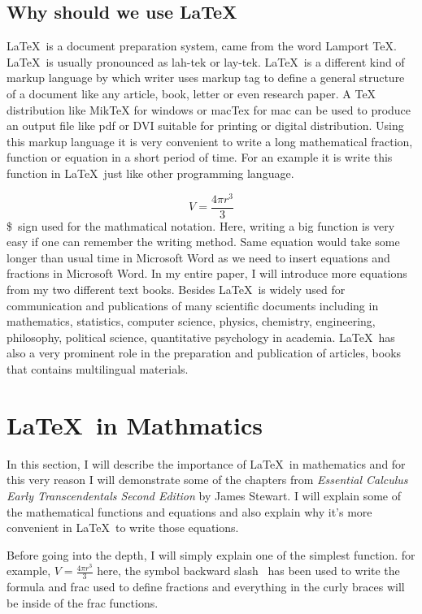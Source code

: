 \documentclass[12pt, a4paper]{article}
\begin{document}
	\subsection*{Why should we use \LaTeX\  }
	

	 \LaTeX\ is a document preparation system, came from the word Lamport TeX. \LaTeX\ is usually pronounced as lah-tek or lay-tek. \LaTeX\ is a different kind of markup language by which writer uses markup tag to define a general structure of a document like any article, book, letter or even research paper. A TeX distribution like MikTeX for windows or macTex for mac can be used to produce an output file like pdf or DVI suitable for printing or digital distribution. Using this markup language it is very convenient to write a long mathematical fraction, function or equation in a short period of time.  For an example it is write this function in \LaTeX\  just like other programming language. 
	
	$$  V = \frac{4 \pi r^3}{3}  $$
	\noindent
\$\  sign used for the mathmatical notation.  Here, writing a big function is very easy if one can remember the writing method. Same equation would take some longer than usual time in Microsoft Word as we need to insert equations and fractions in Microsoft Word. In my entire paper, I will introduce more equations from my two different text books.
	\noindent
Besides \LaTeX\ is widely used for communication and publications of many scientific documents including in mathematics, statistics, computer science, physics, chemistry, engineering, philosophy, political science, quantitative psychology in academia. \LaTeX\ has also a very prominent role in the preparation and publication of articles, books that contains multilingual materials. 
	
\section*{ \LaTeX\ in Mathmatics}
In this section, I will describe the importance of \LaTeX\ in mathematics and for this very reason I will demonstrate some of the chapters from \emph{Essential Calculus Early Transcendentals Second Edition} by James Stewart. I will explain some of the mathematical functions and equations and also explain why it's more convenient in \LaTeX\  to write those equations. 

\noindent
Before going into the depth, I will simply explain one of the simplest function. 
for example, $   V = \frac{4 \pi r^3}{3}  $
here, the symbol backward slash \ has been used to write the formula and frac used to define fractions and everything in the curly braces will be inside of the frac functions. 
\end{document}
